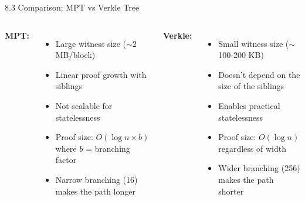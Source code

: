 \documentclass{beamer}
\begin{document}
\begin{frame}{8.3 Comparison: MPT vs Verkle Tree}
    \begin{columns}[t]
    \textbf{MPT:}
    \begin{itemize}
        \item Large witness size ($\sim$2 MB/block)
        \item Linear proof growth with siblings
        \item Not scalable for statelessness
        \item Proof size: $O(\log n \times b)$ where $b$ = branching factor
        \item Narrow branching (16) makes the path longer
    \end{itemize}
    
    \textbf{Verkle:}
    \begin{itemize}
        \item Small witness size ($\sim$100-200 KB)
        \item Doesn't depend on the size of the siblings
        \item Enables practical statelessness
        \item Proof size: $O(\log n)$ regardless of width
        \item Wider branching (256) makes the path shorter
    \end{itemize}
    \end{columns}
    
\end{frame}
\end{document}
